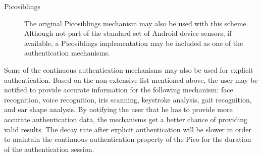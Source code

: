 \begin{description}
  \item[Picosiblings]
  The original Picosiblings mechanism may also be used with this scheme. Although not part of the standard set of Android device sensors, if available, a Picosiblings implementation may be included as one of the authentication mechanisms.
\end{description}

Some of the continuous authentication mechanisms may also be used for explicit authentication. Based on the non-extensive list mentioned above, the user may be notified to provide accurate information for the following mechanism: face recognition, voice recognition, iris scanning, keystroke analysis, gait recognition, and ear shape analysis. By notifying the user that he has to provide more accurate authentication data, the mechanisms get a better chance of providing valid results. The decay rate after explicit authentication will be slower in order to maintain the continuous authentication property of the Pico for the duration of the authentication session.

